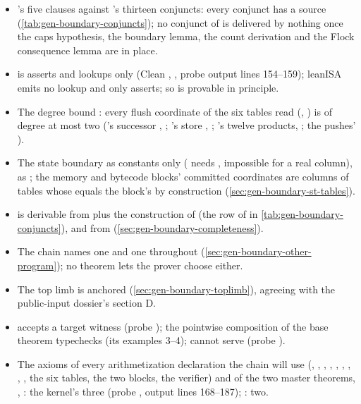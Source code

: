 \begin{sloppypar}
\begin{itemize}
\item {}'s five clauses against 's thirteen conjuncts: every conjunct
  has a source (\cref{tab:gen-boundary-conjuncts}); no conjunct of  is delivered
  by nothing once the caps hypothesis, the boundary lemma, the count derivation and the Flock
  consequence lemma are in place.
\item {} is asserts and lookups only (Clean ,
  , probe  output lines 154--159); leanISA
  emits no lookup and only  asserts; so  is provable in
  principle.
\item The degree bound : every flush coordinate of the six tables read
  (, ) is of degree at most two
  ('s successor , ; 's
  store , ; 's twelve
  products, ; the pushes' ).
\item The state boundary as constants only ( needs ,
  impossible for a real column), as ; the memory and bytecode blocks'
  committed coordinates are columns of tables whose  equals the block's  by
  construction (\cref{sec:gen-boundary-st-tables}).
\item {} is derivable from  plus the construction of  (the
  row of  in \cref{tab:gen-boundary-conjuncts}), and 
  from  (\cref{sec:gen-boundary-completeness}).
\item The chain names one  and one  throughout
  (\cref{sec:gen-boundary-other-program}); no theorem lets the prover choose either.
\item The top limb is anchored (\cref{sec:gen-boundary-toplimb}), agreeing with the public-input
  dossier's section D.
\item {} accepts a  target witness (probe ); the
  pointwise composition of the base theorem typechecks (its examples 3--4);
   cannot serve (probe ).
\item The axioms of every arithmetization declaration the chain will use
  (, , ,
  , , ,
  , , , the six
  tables, the two blocks, the verifier) and of the two master theorems, ,
  : the kernel's three (probe , output lines 168--187);
  : two.
\end{itemize}
\end{sloppypar}
